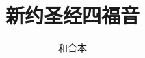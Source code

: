 \documentclass[12pt,oneside]{book}
\begin{document}
\title{新约圣经四福音}
\author{和合本}

\makemytitleA
\end{document}
